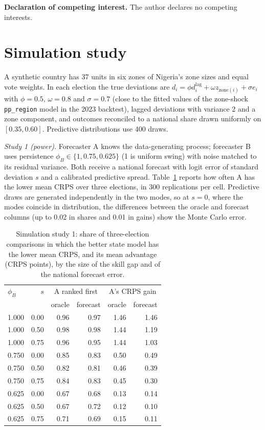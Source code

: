 \documentclass[preprint,12pt,authoryear]{elsarticle}
\begin{document}
\vspace{1em}
\noindent\textbf{Declaration of competing interest.} The author declares no competing interests.

\appendix

\section{Simulation study}
\label{app:simulation}
A synthetic country has 37 units in six zones of Nigeria's zone sizes and equal vote weights. In each election the true deviations are $d_i = \phi d^{\text{lag}}_i + \omega z_{\text{zone}(i)} + \sigma e_i$ with $\phi = 0.5$, $\omega = 0.8$ and $\sigma = 0.7$ (close to the fitted values of the zone-shock \texttt{pp\_region} model in the 2023 backtest), lagged deviations with variance 2 and a zone component, and outcomes reconciled to a national share drawn uniformly on $[0.35, 0.60]$. Predictive distributions use 400 draws.

\emph{Study 1 (power).} Forecaster A knows the data-generating process; forecaster B uses persistence $\phi_B \in \{1, 0.75, 0.625\}$ (1 is uniform swing) with noise matched to its residual variance. Both receive a national forecast with logit error of standard deviation $s$ and a calibrated predictive spread. Table~\ref{tab:sim1} reports how often A has the lower mean CRPS over three elections, in 300 replications per cell. Predictive draws are generated independently in the two modes, so at $s = 0$, where the modes coincide in distribution, the differences between the oracle and forecast columns (up to 0.02 in shares and 0.01 in gains) show the Monte Carlo error.

\begin{table}[ht]
\centering
\caption{Simulation study 1: share of three-election comparisons in which the better state model has the lower mean CRPS, and its mean advantage (CRPS points), by the size of the skill gap and of the national forecast error.}
\label{tab:sim1}
\small
\begin{tabular}{lrrrrr}
\toprule
$\phi_B$ & $s$ & \multicolumn{2}{c}{A ranked first} & \multicolumn{2}{c}{A's CRPS gain} \\
 & & oracle & forecast & oracle & forecast \\
\midrule
1.000 & 0.00 & 0.96 & 0.97 & 1.46 & 1.46 \\
1.000 & 0.50 & 0.98 & 0.98 & 1.44 & 1.19 \\
1.000 & 0.75 & 0.96 & 0.95 & 1.44 & 1.03 \\
0.750 & 0.00 & 0.85 & 0.83 & 0.50 & 0.49 \\
0.750 & 0.50 & 0.82 & 0.81 & 0.46 & 0.39 \\
0.750 & 0.75 & 0.84 & 0.83 & 0.45 & 0.30 \\
0.625 & 0.00 & 0.67 & 0.68 & 0.13 & 0.14 \\
0.625 & 0.50 & 0.67 & 0.72 & 0.12 & 0.10 \\
0.625 & 0.75 & 0.71 & 0.69 & 0.15 & 0.11 \\
\bottomrule
\end{tabular}
\end{table}
\end{document}
